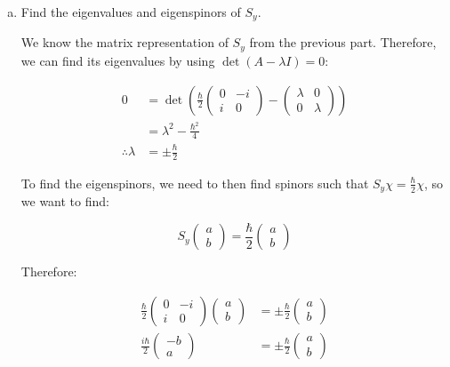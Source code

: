 \documentclass[10pt]{article}
\begin{document}
    \begin{enumerate}[(a)]
        \item Find the eigenvalues and eigenspinors of $S_y$.
        
        \begin{solution}
            We know the matrix representation of $S_y$ from the previous part. Therefore, we can find its eigenvalues by using $\det(A - \lambda I) = 0$:

            \begin{align*}
                0 &= \det\left( \frac{\hbar}{2}\begin{pmatrix}
                    0 & -i\\
                    i & 0
                \end{pmatrix} - \begin{pmatrix}
                    \lambda & 0\\
                    0 & \lambda
                \end{pmatrix}\right) \\
                &=  \lambda^2 - \frac{\hbar^2}{4}\\
                \therefore \lambda &= \pm \frac{\hbar}{2}
            \end{align*}

            To find the eigenspinors, we need to then find spinors such that $S_y \chi = \frac \hbar 2 \chi$, so we want to find: 

            \[ S_y \begin{pmatrix}
                a \\ b
            \end{pmatrix} = \frac{\hbar}{2} \begin{pmatrix}
                a \\ b
            \end{pmatrix}\]

            Therefore: 

            \begin{align*}
                \frac{\hbar}{2} \begin{pmatrix}
                    0 & -i\\
                    i & 0
                \end{pmatrix}\begin{pmatrix}
                    a \\ b
                \end{pmatrix} &= \pm \frac{\hbar}{2} \begin{pmatrix}
                    a \\ b
                \end{pmatrix}\\
                \frac{i\hbar}{2} \begin{pmatrix}
                    -b \\ a
                \end{pmatrix} &= \pm \frac{\hbar}{2} \begin{pmatrix}
                    a \\ b
                \end{pmatrix}
            \end{align*}


\end{solution}
\end{enumerate}
\end{document}
